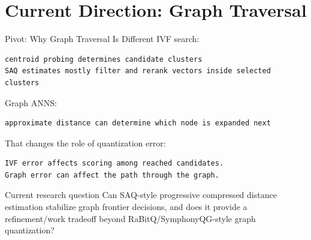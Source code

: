 \documentclass[aspectratio=169,10pt]{beamer}
\begin{document}
\section{Current Direction: Graph Traversal}

\begin{frame}[fragile]{Pivot: Why Graph Traversal Is Different}
\small
IVF search:
\begin{lstlisting}
centroid probing determines candidate clusters
SAQ estimates mostly filter and rerank vectors inside selected clusters
\end{lstlisting}

Graph ANNS:
\begin{lstlisting}
approximate distance can determine which node is expanded next
\end{lstlisting}

That changes the role of quantization error:
\begin{lstlisting}
IVF error affects scoring among reached candidates.
Graph error can affect the path through the graph.
\end{lstlisting}

\begin{block}{Current research question}
Can SAQ-style progressive compressed distance estimation stabilize graph
frontier decisions, and does it provide a refinement/work tradeoff beyond
RaBitQ/SymphonyQG-style graph quantization?
\end{block}
\end{frame}
\end{document}
